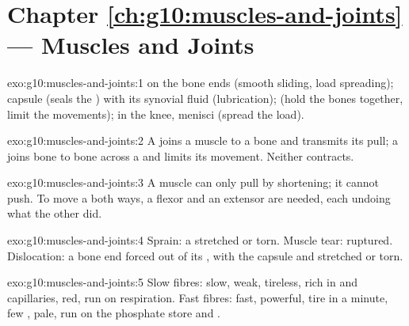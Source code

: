 \section*{Chapter \ref{ch:g10:muscles-and-joints} --- Muscles and Joints}

\begin{solution}{exo:g10:muscles-and-joints:1}
 on the bone ends (smooth sliding, load spreading); capsule
(seals the ) with its synovial fluid (lubrication); 
(hold the bones together, limit the movements); in the knee, menisci
(spread the load).
\end{solution}

\begin{solution}{exo:g10:muscles-and-joints:2}
A  joins a muscle to a bone and transmits its pull; a 
joins bone to bone across a  and limits its movement. Neither
contracts.
\end{solution}

\begin{solution}{exo:g10:muscles-and-joints:3}
A muscle can only pull by shortening; it cannot push. To move a 
both ways, a flexor and an extensor are needed, each undoing what the
other did.
\end{solution}

\begin{solution}{exo:g10:muscles-and-joints:4}
Sprain: a  stretched or torn. Muscle tear: 
ruptured. Dislocation: a bone end forced out of its , with the
capsule and  stretched or torn.
\end{solution}

\begin{solution}{exo:g10:muscles-and-joints:5}
Slow fibres: slow, weak, tireless, rich in  and
capillaries, red, run on respiration. Fast fibres: fast, powerful,
tire in a minute, few , pale, run on the phosphate store
and .
\end{solution}

